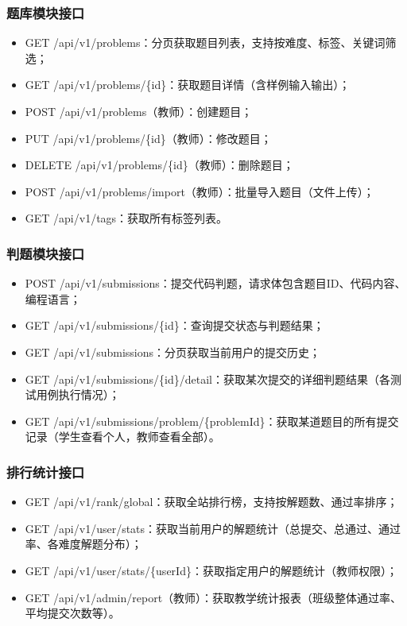 \documentclass{../template/softeng}
\begin{document}
\subsubsection{题库模块接口}
\begin{itemize}
	\item GET /api/v1/problems：分页获取题目列表，支持按难度、标签、关键词筛选；
	\item GET /api/v1/problems/\{id\}：获取题目详情（含样例输入输出）；
	\item POST /api/v1/problems（教师）：创建题目；
	\item PUT /api/v1/problems/\{id\}（教师）：修改题目；
	\item DELETE /api/v1/problems/\{id\}（教师）：删除题目；
	\item POST /api/v1/problems/import（教师）：批量导入题目（文件上传）；
	\item GET /api/v1/tags：获取所有标签列表。
\end{itemize}

\subsubsection{判题模块接口}
\begin{itemize}
	\item POST /api/v1/submissions：提交代码判题，请求体包含题目ID、代码内容、编程语言；
	\item GET /api/v1/submissions/\{id\}：查询提交状态与判题结果；
	\item GET /api/v1/submissions：分页获取当前用户的提交历史；
	\item GET /api/v1/submissions/\{id\}/detail：获取某次提交的详细判题结果（各测试用例执行情况）；
	\item GET /api/v1/submissions/problem/\{problemId\}：获取某道题目的所有提交记录（学生查看个人，教师查看全部）。
\end{itemize}

\subsubsection{排行统计接口}
\begin{itemize}
	\item GET /api/v1/rank/global：获取全站排行榜，支持按解题数、通过率排序；
	\item GET /api/v1/user/stats：获取当前用户的解题统计（总提交、总通过、通过率、各难度解题分布）；
	\item GET /api/v1/user/stats/\{userId\}：获取指定用户的解题统计（教师权限）；
	\item GET /api/v1/admin/report（教师）：获取教学统计报表（班级整体通过率、平均提交次数等）。
\end{itemize}
\end{document}
